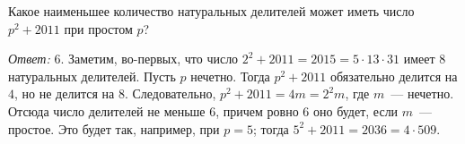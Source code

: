 Какое наименьшее количество натуральных делителей может иметь число
$p^2 + 2011$ при простом $p$?

\solution
\emph{Ответ:} $6$.
Заметим, во-первых, что число
$2^2 + 2011 = 2015 = 5 \cdot 13 \cdot 31$
имеет $8$ натуральных делителей.
Пусть $p$ нечетно.
Тогда $p^2 + 2011$ обязательно делится на $4$, но не делится на $8$.
Следовательно, $p^2 + 2011 = 4 m = 2^2 m$, где $m$~--- нечетно.
Отсюда число делителей не меньше $6$, причем ровно $6$ оно будет, если
$m$~--- простое.
Это будет так, например, при $p = 5$; тогда $5^2 + 2011 = 2036 = 4 \cdot 509$.

